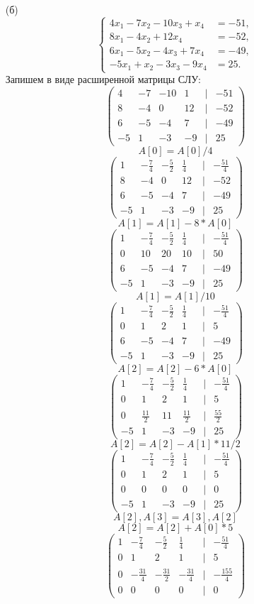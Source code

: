 \documentclass[a4paper]{article}
\newcommand{\mat}[1]{\begin{pmatrix} #1 \end{pmatrix}}
\begin{document}
\begin{enumerate}
\begin{enumerate}
        \item[(б)]
        $$\begin{cases}
            4x_1 - 7x_2 - 10x_3 + x_4 &= -51, \\
            8x_1 - 4x_2 + 12x_4 &= -52, \\
            6x_1 - 5x_2 - 4x_3 + 7x_4 &= -49, \\
            -5x_1 + x_2 - 3x_3 - 9x_4 &= 25.
          \end{cases}$$
        Запишем в виде расширенной матрицы СЛУ:
        $$\mat{
            4 & -7 & -10 &  1 & | & -51 \\
            8 &  -4 &  0  & 12 & | & -52 \\
            6 & -5 & -4  &  7 & | & -49 \\
           -5 &  1 & -3  & -9 & | &  25
        }$$
        $$A[0] = A[0]/4$$
        $$ \mat{1 & -\frac{7}{4} & -\frac{5}{2} & \frac{1}{4} & | & -\frac{51}{4} \\ 8 & -4 & 0 & 12 & | & -52 \\ 6 & -5 & -4 & 7 & | & -49 \\ -5 & 1 & -3 & -9 & | & 25} $$
        $$A[1] = A[1] - 8*A[0]$$
        $$ \mat{1 & -\frac{7}{4} & -\frac{5}{2} & \frac{1}{4} & | & -\frac{51}{4} \\ 0 & 10 & 20 & 10 & | & 50 \\ 6 & -5 & -4 & 7 & | & -49 \\ -5 & 1 & -3 & -9 & | & 25} $$
        $$A[1] = A[1]/10$$
        $$ \mat{1 & -\frac{7}{4} & -\frac{5}{2} & \frac{1}{4} & | & -\frac{51}{4} \\ 0 & 1 & 2 & 1 & | & 5 \\ 6 & -5 & -4 & 7 & | & -49 \\ -5 & 1 & -3 & -9 & | & 25} $$
        $$A[2] = A[2]-6*A[0]$$
        $$ \mat{1 & -\frac{7}{4} & -\frac{5}{2} & \frac{1}{4} & | & -\frac{51}{4} \\ 0 & 1 & 2 & 1 & | & 5 \\ 0 & \frac{11}{2} & 11 & \frac{11}{2} & | & \frac{55}{2} \\ -5 & 1 & -3 & -9 & | & 25} $$
        $$A[2] = A[2]-A[1]*11/2$$
        $$ \mat{1 & -\frac{7}{4} & -\frac{5}{2} & \frac{1}{4} & | & -\frac{51}{4} \\ 0 & 1 & 2 & 1 & | & 5 \\ 0 & 0 & 0 & 0 & | & 0 \\ -5 & 1 & -3 & -9 & | & 25} $$
        $$A[2], A[3] = A[3], A[2]$$
        $$A[2] = A[2]+A[0]*5$$
        $$ \mat{1 & -\frac{7}{4} & -\frac{5}{2} & \frac{1}{4} & | & -\frac{51}{4} \\ 0 & 1 & 2 & 1 & | & 5 \\ 0 & -\frac{31}{4} & -\frac{31}{2} & -\frac{31}{4} & | & -\frac{155}{4} \\ 0 & 0 & 0 & 0 & | & 0} $$

\end{enumerate}
\end{enumerate}
\end{document}
